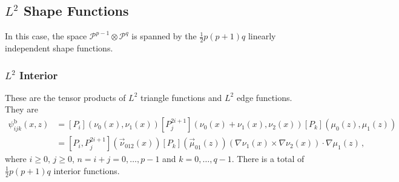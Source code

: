 \subsection{\texorpdfstring{$L^2$}{L2} Shape Functions}
In this case, the space $\mathcal{P}^{p-1}\otimes\mathcal{P}^q$ is spanned by the $\frac{1}{2}p(p+1)q$ linearly independent shape functions.


\subsubsection{\texorpdfstring{$L^2$}{L2} Interior}

These are the tensor products of $L^2$ triangle functions and $L^2$ edge functions. 
They are
\begin{equation}
 \begin{aligned}
	 \psi_{ijk}^\mathrm{b}(x,z)&=[P_i](\nu_0(x),\nu_1(x))[P_j^{2i+1}](\nu_0(x)+\nu_1(x),\nu_2(x))[P_k](\mu_0(z),\mu_1(z))\\
		 &=[P_i,P_j^{2i+1}](\vec{\nu}_{012}(x))[P_k](\vec{\mu}_{01}(z))
		 	(\nabla\nu_1(x)\!\!\times\!\!\nabla\nu_2(x))\!\cdot\!\nabla\mu_1(z)\,,
	\end{aligned}
\end{equation}
where $i\geq0$, $j\geq0$, $n=i+j=0,\ldots,p-1$ and $k=0,\ldots,q-1$. 
There is a total of $\frac{1}{2}p(p+1)q$ interior functions.



